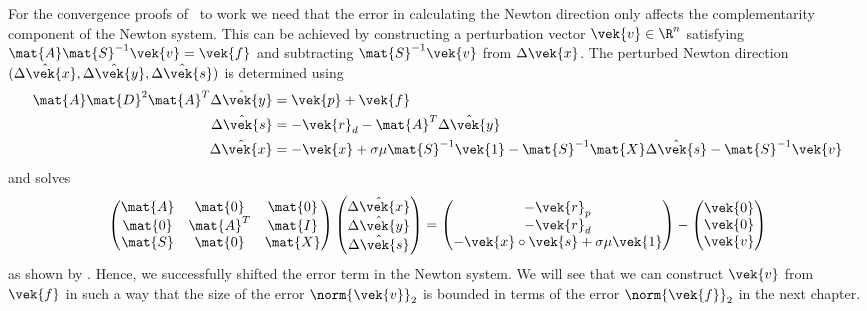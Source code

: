 For the convergence proofs of~\cite{Monteiro-ConvergenceAnalysisLongStepInfeasibleIPMs} to work we need that the error in calculating the Newton direction only affects the complementarity component of the Newton system.
This can be achieved by constructing a perturbation vector \(\vek{v} \in \R^n\) satisfying \(\mat{A}\mat{S}^{-1}\vek{v} = \vek{f}\) and subtracting \(\mat{S}^{-1}\vek{v}\) from \(\Delta\vek{x}\).
The perturbed Newton direction \((\hat{\Delta\vek{x}}, \hat{\Delta\vek{y}}, \hat{\Delta\vek{s}})\) is determined using
\begin{subequations}
  \begin{align}
    \mat{A} \mat{D}^2 \mat{A}^T \hat{\Delta\vek{y}} &= \vek{p} + \vek{f} \\
    \hat{\Delta\vek{s}} &= -\vek{r}_d - \mat{A}^T \hat{\Delta\vek{y}} \\
    \hat{\Delta\vek{x}} &= -\vek{x} + \sigma \mu \mat{S}^{-1} \vek{1} - \mat{S}^{-1} \mat{X} \hat{\Delta\vek{s}} - \mat{S}^{-1} \vek{v}
  \end{align}
\end{subequations}
and solves
\begin{equation}
  \begin{pmatrix}
    \mat{A} & \mat{0}   & \mat{0} \\
    \mat{0} & \mat{A}^T & \mat{I} \\
    \mat{S} & \mat{0}   & \mat{X} \\
  \end{pmatrix}
  \begin{pmatrix} \hat{\Delta\vek{x}} \\ \hat{\Delta\vek{y}} \\ \hat{\Delta\vek{s}} \end{pmatrix}
  =
  \begin{pmatrix} -\vek{r}_p \\ -\vek{r}_d \\ -\vek{x} \circ \vek{s} + \sigma \mu \vek{1} \end{pmatrix}
  -
  \begin{pmatrix} \vek{0} \\ \vek{0} \\ \vek{v} \end{pmatrix}
\end{equation}
as shown by \textcite[p. 10]{Monteiro-ConvergenceAnalysisLongStepInfeasibleIPMs}.
Hence, we successfully shifted the error term in the Newton system.
We will see that we can construct \(\vek{v}\) from \(\vek{f}\) in such a way that the size of the error \(\norm{\vek{v}}_2\) is bounded in terms of the error \(\norm{\vek{f}}_2\) in the next chapter.
